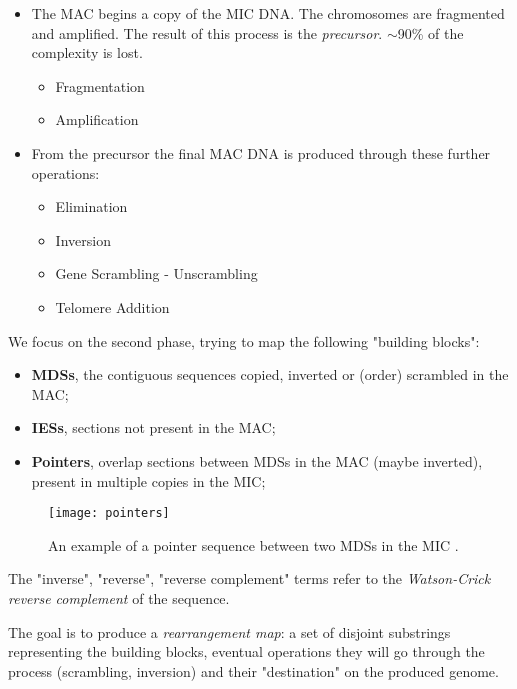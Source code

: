\begin{itemize}
	\item The MAC begins a copy of the MIC DNA. The chromosomes are fragmented and amplified. The result of this process is the \textit{precursor}. $\sim$90\% of the complexity is lost.
	\begin{itemize}
    	\item Fragmentation
    	\item Amplification
    \end{itemize}

	\item From the precursor the final MAC DNA is produced through these further operations:
	\begin{itemize}
    	\item Elimination
    	\item Inversion
    	\item Gene Scrambling - Unscrambling
    	\item Telomere Addition
    \end{itemize}

\end{itemize}

We focus on the second phase, trying to map the following "building blocks":

\begin{itemize}
	\item \textbf{MDSs}, the contiguous sequences copied, inverted or (order) scrambled in the MAC;
	\item \textbf{IESs}, sections not present in the MAC;
	\item \textbf{Pointers}, overlap sections between MDSs in the MAC (maybe inverted), present in multiple copies in the MIC;
\end{itemize}

\begin{figure}[h]
  \centering
    \texttt{[image: pointers]}
  \caption{ An example of a pointer sequence between two MDSs in the MIC \cite{ANGELESKA2007706}.}
\end{figure}

The "inverse", "reverse", "reverse complement" terms refer to the \textit{Watson-Crick reverse complement} of the sequence.

The goal is to produce a \textit{rearrangement map}: a set of disjoint substrings representing the building blocks, eventual operations they will go through the process (scrambling, inversion) and their "destination" on the produced genome.

